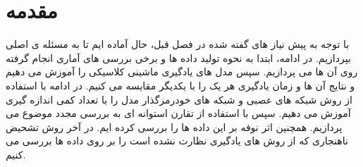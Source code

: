 \section{مقدمه}

با توجه به پیش نیاز های گفته شده در فصل قبل، حال آماده ایم تا به مسئله ی اصلی بپردازیم. در ادامه، ابتدا به نحوه تولید داده ها و برخی بررسی های آماری انجام گرفته روی آن ها می پردازیم.
سپس مدل های یادگیری ماشینی کلاسیکی را آموزش می دهیم و نتایج آن ها و زمان یادگیری هر یک را با یکدیگر مقایسه می کنیم.
در ادامه با استفاده از روش شبکه های عصبی و شبکه های خودرمزگذار مدل را با تعداد کمی اندازه گیری آموزش می دهیم. سپس با استفاده از تقارن استوانه ای به بررسی مجدد موضوع می پردازیم.
همچنین اثر نوفه بر این داده ها را بررسی کرده ایم.
در آخر روش تشحیض ناهنجاری
که از روش های یادگیری نظارت نشده است را بر روی داده ها بررسی می کنیم.
